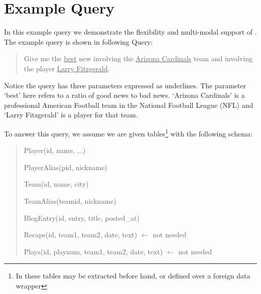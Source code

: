 
\section{Example Query}

In this example query we demonstrate the flexibility and multi-modal 
support of \system. The example query is shown in following Query:


\begin{quotation}

Give me the \underline{best} new involving the \underline{Arizona Cardinals} 
team and involving the player \underline{Larry Fitzgerald}.

\end{quotation}


Notice the query has three parameters expressed as underlines.
The parameter `best' here refers to a ratio of good news to bad news.
`Arizona Cardinals' is a professional American Football team in the National
Football League (NFL) and `Larry Fitzgerald' is a player for that team.

To answer this query, we assume we are given tables\footnote{In {\system} these
tables may be extracted before hand, or defined over a foreign data wrapper}
with the following schema:

\begin{quotation}
Player(id, name, ...)

PlayerAlias(pid, nickname)

Team(id, name, city)

TeamAlias(teamid, nickname)

BlogEntry(id, entry, title, posted\_at)

Recaps(id, team1, team2, date, text) $\leftarrow$ not needed

Plays(id, playnum, team1, team2, date, text) $\leftarrow$ not needed
\end{quotation}



